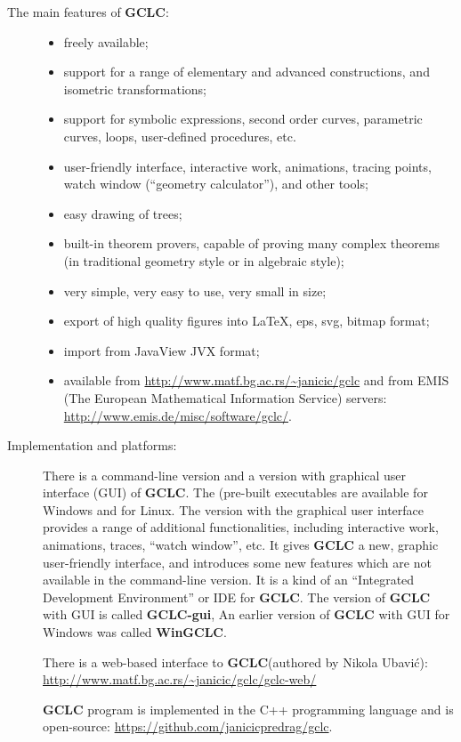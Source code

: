 \documentclass[a4paper]{book}
\newcommand{\gclc}{{\bfseries GCLC}\xspace}
\newcommand{\wingclc}{{\bfseries WinGCLC}\xspace}
\newcommand{\gclcgui}{{\bfseries GCLC-gui}\xspace}
\begin{document}
\begin{description}
\item[The main features of \gclc:] \hfill
\begin{itemize}
\item freely available;
\item support for a range of elementary and advanced constructions,
and isometric transformations;
\item support for symbolic expressions, second order curves,
parametric curves, loops, user-defined procedures, etc.
\item user-friendly interface, interactive work, animations,
tracing points, watch window (``geometry calculator''), and other
tools;
\item easy drawing of trees;
\item built-in theorem provers, capable of proving many complex
theorems (in traditional geometry style or in algebraic style);
\item very simple, very easy to use, very small in size;
\item export of high quality figures into \LaTeX{}, {\sc eps},
{\sc svg}, bitmap format;
\item import from JavaView JVX format;
\item available from \url{http://www.matf.bg.ac.rs/~janicic/gclc}
and from EMIS (The European Mathematical Information Service) servers:
\url{http://www.emis.de/misc/software/gclc/}.
\end{itemize}

\item[Implementation and platforms:]
There is a command-line version and a version with graphical user
interface (GUI) of \gclc. The (pre-built executables are available for Windows and for Linux.
The version with the graphical user interface provides a
range of additional functionalities, including interactive work,
animations, traces, ``watch window'', etc. It gives \gclc a new,
graphic user-friendly interface, and introduces some new features
which are not available in the command-line version. It is a kind
of an ``Integrated Development Environment'' or IDE for \gclc.
The version of \gclc with GUI is called \gclcgui,
An earlier version of \gclc with GUI for Windows was called \wingclc.
\index{wingclc@\wingclc}
\index{gclc-gui@\gclcgui}

There is a web-based interface to \gclc (authored by Nikola Ubavić):
\url{http://www.matf.bg.ac.rs/~janicic/gclc/gclc-web/}

\gclc program is implemented in the C++ programming language
and is open-source: \url{https://github.com/janicicpredrag/gclc}.


\end{description}
\end{document}

